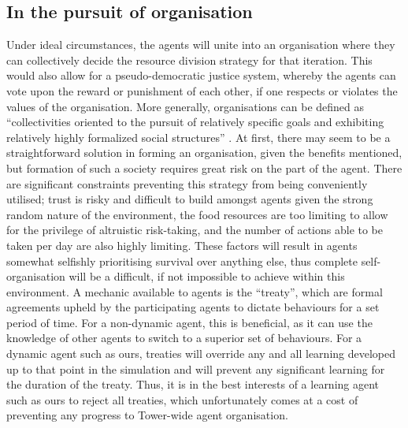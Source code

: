 \subsection{In the pursuit of organisation}\label{team2-organisation}
Under ideal circumstances, the agents will unite into an organisation where they can collectively decide the resource division strategy for that iteration. This would also allow for a pseudo-democratic justice system, whereby the agents can vote upon the reward or punishment of each other, if one respects or violates the values of the organisation. More generally, organisations can be defined as “collectivities oriented to the pursuit of relatively specific goals and exhibiting relatively highly formalized social structures” \cite{WhettenDavidA1983ORNa}. At first, there may seem to be a straightforward solution in forming an organisation, given the benefits mentioned, but formation of such a society requires great risk on the part of the agent. There are significant constraints preventing this strategy from being conveniently utilised; trust is risky and difficult to build amongst agents given the strong random nature of the environment, the food resources are too limiting to allow for the privilege of altruistic risk-taking, and the number of actions able to be taken per day are also highly limiting. These factors will result in agents somewhat selfishly prioritising survival over anything else, thus complete self-organisation will be a difficult, if not impossible to achieve within this environment. A mechanic available to agents is the “treaty”, which are formal agreements upheld by the participating agents to dictate behaviours for a set period of time. For a non-dynamic agent, this is beneficial, as it can use the knowledge of other agents to switch to a superior set of behaviours. For a dynamic agent such as ours, treaties will override any and all learning developed up to that point in the simulation and will prevent any significant learning for the duration of the treaty. Thus, it is in the best interests of a learning agent such as ours to reject all treaties, which unfortunately comes at a cost of preventing any progress to Tower-wide agent organisation. 
